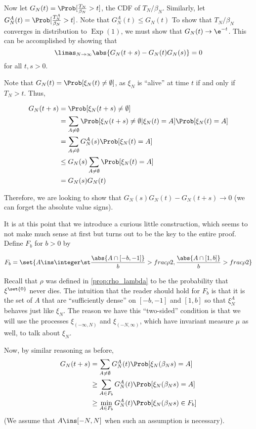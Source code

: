 \documentclass{scrartcl}
\DeclareMathOperator{\expDist}{Exp}
\begin{document}
Now let $G_{N}(t) = \Prob[\frac{T_{N}}{\beta_{N}} > t]$, the CDF of $T_{N}/\beta_{N}$. Similarly, let $G_{N}^{A}(t) = \Prob[\frac{T^{A}_{N}}{\beta_{N}} > t]$. Note that $G_{N}^{A}(t) \leq G_{N}(t)$ To show that $T_{N}/\beta_{N}$ converges in distribution to $\expDist(1)$, we must show that $G_{N}(t) \to \e^{-t}$. This can be accomplished by showing that
\[ \limas_{N \to \infty} \abs{G_{N}(t+s) - G_{N}(t)G_{N}(s)} = 0 \]
for all $t,s > 0$.

Note that $G_{N}(t) = \Prob[\xi_{N}(t) \neq \emptyset]$, as $\xi_{N}$ is ``alive'' at time $t$ if and only if $T_{N} > t$. Thus,

\begin{align*}
  G_{N}(t+s) &= \Prob[\xi_{N}(t+s) \neq \emptyset] \\
             &= \sum_{A \neq \emptyset} \Prob[\xi_{N}(t+s) \neq \emptyset | \xi_{N}(t) = A] \Prob[\xi_{N}(t) = A] \\
             &= \sum_{A \neq \emptyset} G_{N}^{A}(s) \Prob[\xi_{N}(t) = A] \\
             &\leq G_{N}(s) \sum_{A \neq \emptyset} \Prob[\xi_{N}(t) = A] \\
             &= G_{N}(s) G_{N}(t)
\end{align*}

Therefore, we are looking to show that $G_{N}(s) G_{N}(t) - G_{N}(t+s) \to 0$ (we can forget the absolute value signs).

It is at this point that we introduce a curious little construction, which seems to not make much sense at first but turns out to be the key to the entire proof. Define $F_{b}$ for $b > 0$ by

\[ F_{b} = \set{A \ins \integer \st \frac{\abs{A \cap [-b,-1]}}{b} > frac{\rho}{2}, \frac{\abs{A \cap [1,b]}}{b} > frac{\rho}{2}} \]

Recall that $\rho$ was defined in \ref{prop:rho_lambda} to be the probability that $\xi^{\set{0}}$ never dies. The intuition that the reader should hold for $F_{b}$ is that it is the set of $A$ that are ``sufficiently dense'' on $[-b,-1]$ and $[1,b]$ so that $\xi^{A}_{N}$ behaves just like $\xi_{N}$. The reason we have this ``two-sided'' condition is that we will use the processes $\xi_{(-\infty,N)}$ and $\xi_{(-N,\infty)}$, which have invariant measure $\mu$ as well, to talk about $\xi_{N}$.

Now, by similar reasoning as before,
\begin{align*}
  G_{N}(t+s) &= \sum_{A \neq \emptyset} G_{N}^{A}(t) \Prob[\xi_{N}(\beta_{N}s) = A] \\
  &\geq \sum_{A \in F_{b}} G_{N}^{A}(t) \Prob[\xi_{N}(\beta_{N}s) = A] \\
  &\geq \min_{A \in F_{b}} G_{N}^{A}(t) \Prob[\xi_{N}(\beta_{N}s) \in F_{b}]
\end{align*}
(We assume that $A \ins [-N,N]$ when such an assumption is necessary).
\end{document}
